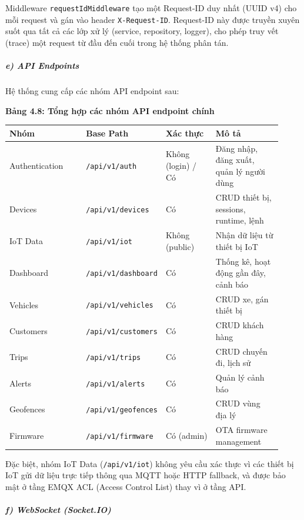 \documentclass[13pt,a4paper]{extarticle}
\newcounter{none} %
\newcommand{\thesislongtableorignewline}{}
\let\thesislongtableorignewline\\
\renewcommand{\\}{\thesislongtableorignewline\hline}%
\let\\\thesislongtableorignewline
\newcommand{\thesistabletitle}[1]{%
  \begin{center}\textbf{#1}\end{center}%
}
\begin{document}
Middleware \texttt{requestIdMiddleware} tạo một Request-ID duy nhất
(UUID v4) cho mỗi request và gán vào header \texttt{X-Request-ID}.
Request-ID này được truyền xuyên suốt qua tất cả các lớp xử lý (service,
repository, logger), cho phép truy vết (trace) một request từ đầu đến
cuối trong hệ thống phân tán.

\subparagraph{e) API Endpoints}\label{e-api-endpoints}

Hệ thống cung cấp các nhóm API endpoint sau:

\thesistabletitle{Bảng 4.8: Tổng hợp các nhóm API endpoint chính}

{\def\LTcaptype{none} %
\begin{longtable}{|p{0.30\linewidth}|p{0.16\linewidth}|p{0.20\linewidth}|p{0.26\linewidth}|}
\hline \textbf{Nhóm} & \textbf{Base Path} & \textbf{Xác thực} & \textbf{Mô tả} \\
\hline
\endhead
\hline
\endlastfoot
Authentication & \texttt{/api/v1/auth} & Không (login) / Có & Đăng nhập,
đăng xuất, quản lý người dùng \\
Devices & \texttt{/api/v1/devices} & Có & CRUD thiết bị, sessions,
runtime, lệnh \\
IoT Data & \texttt{/api/v1/iot} & Không (public) & Nhận dữ liệu từ thiết
bị IoT \\
Dashboard & \texttt{/api/v1/dashboard} & Có & Thống kê, hoạt động gần
đây, cảnh báo \\
Vehicles & \texttt{/api/v1/vehicles} & Có & CRUD xe, gán thiết bị \\
Customers & \texttt{/api/v1/customers} & Có & CRUD khách hàng \\
Trips & \texttt{/api/v1/trips} & Có & CRUD chuyến đi, lịch sử \\
Alerts & \texttt{/api/v1/alerts} & Có & Quản lý cảnh báo \\
Geofences & \texttt{/api/v1/geofences} & Có & CRUD vùng địa lý \\
Firmware & \texttt{/api/v1/firmware} & Có (admin) & OTA firmware
management \\
\end{longtable}
}

Đặc biệt, nhóm IoT Data (\texttt{/api/v1/iot}) không yêu cầu xác thực vì
các thiết bị IoT gửi dữ liệu trực tiếp thông qua MQTT hoặc HTTP
fallback, và được bảo mật ở tầng EMQX ACL (Access Control List) thay vì
ở tầng API.

\subparagraph{f) WebSocket (Socket.IO)}\label{f-websocket-socketio}
\end{document}
